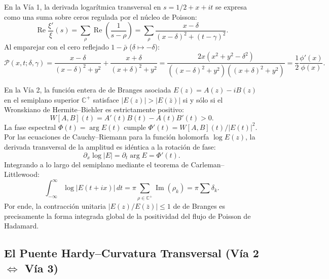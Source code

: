 \documentclass[11pt,a4paper]{article}
\theoremstyle{definition}
\theoremstyle{remark}
\begin{document}
En la Vía 1, la derivada logarítmica transversal en $s = 1/2 + x + it$ se expresa como una suma sobre ceros regulada por el núcleo de Poisson:
\begin{equation}
\operatorname{Re} \frac{\xi'}{\xi}(s) = \sum_\rho \operatorname{Re}\left( \frac{1}{s - \rho} \right) = \sum_\rho \frac{x - \delta}{(x - \delta)^2 + (t - \gamma)^2}.
\end{equation}
Al emparejar con el cero reflejado $1 - \bar{\rho}$ ($\delta \mapsto -\delta$):
\begin{equation}
\mathcal{P}(x, t; \delta, \gamma) = \frac{x - \delta}{(x - \delta)^2 + y^2} + \frac{x + \delta}{(x + \delta)^2 + y^2} = \frac{2x (x^2 + y^2 - \delta^2)}{((x - \delta)^2 + y^2)((x + \delta)^2 + y^2)} = \frac{1}{2} \frac{\phi'(x)}{\phi(x)}.
\end{equation}

En la Vía 2, la función entera de de Branges asociada $E(z) = A(z) - iB(z)$ en el semiplano superior $\mathbb{C}^+$ satisface $|E(z)| > |E(\bar{z})|$ si y sólo si el Wronskiano de Hermite--Biehler es estrictamente positivo:
\begin{equation}
W[A, B](t) = A'(t)B(t) - A(t)B'(t) > 0.
\end{equation}
La fase espectral $\Phi(t) = \arg E(t)$ cumple $\Phi'(t) = W[A, B](t) / |E(t)|^2$. Por las ecuaciones de Cauchy--Riemann para la función holomorfa $\log E(z)$, la derivada transversal de la amplitud es idéntica a la rotación de fase:
\begin{equation}
\partial_x \log |E| = \partial_t \arg E = \Phi'(t).
\end{equation}
Integrando a lo largo del semiplano mediante el teorema de Carleman--Littlewood:
\begin{equation}
\int_{-\infty}^\infty \log |E(t + ix)| \, dt = \pi \sum_{\rho \in \mathbb{C}^+} \operatorname{Im}(\rho_k) = \pi \sum \delta_k.
\end{equation}
Por ende, la contracción unitaria $|E(z)/E(\bar{z})| \le 1$ de de Branges es precisamente la forma integrada global de la positividad del flujo de Poisson de Hadamard.

\subsection{El Puente Hardy--Curvatura Transversal \texorpdfstring{(Vía 2 $\Longleftrightarrow$ Vía 3)}{(Vía 2 <=> Vía 3)}}
\end{document}
